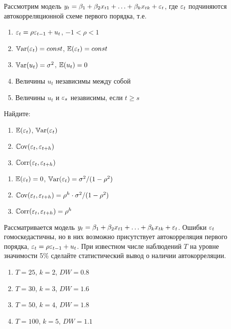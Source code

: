 \begin{problem}
Рассмотрим модель $y_t=\beta_1+\beta_2 x_{t1}+\ldots+\beta_k x_{tk}+\varepsilon_t$, где $\varepsilon_t$ подчиняются автокорреляционной схеме первого порядка, т.е.
\begin{enumerate}
\item $\varepsilon_t=\rho \varepsilon_{t-1}+u_t$, $-1<\rho<1$
\item $\mathbb{V}\mathrm{ar}(\varepsilon_t)=const$, $\mathbb{E}(\varepsilon_t)=const$
\item $\mathbb{V}\mathrm{ar}(u_t)=\sigma^2$, $\mathbb{E}(u_t)=0$
\item Величины $u_t$ независимы между собой
\item Величины $u_t$ и $\varepsilon_s$ независимы, если $t\geq s$
\end{enumerate}
Найдите:
\begin{enumerate}
\item $\mathbb{E}(\varepsilon_t)$, $\mathbb{V}\mathrm{ar}(\varepsilon_t)$
\item $\mathbb{C}\mathrm{ov}(\varepsilon_t,\varepsilon_{t+h})$
\item $\mathbb{C}\mathrm{orr}(\varepsilon_t,\varepsilon_{t+h})$
\end{enumerate}


\begin{sol}
\begin{enumerate}
\item $\mathbb{E}(\varepsilon_t)=0$, $\mathbb{V}\mathrm{ar}(\varepsilon_t)=\sigma^2/(1-\rho^2)$
\item $\mathbb{C}\mathrm{ov}(\varepsilon_t,\varepsilon_{t+h})=\rho^h\cdot \sigma^2/(1-\rho^2)$
\item $\mathbb{C}\mathrm{orr}(\varepsilon_t,\varepsilon_{t+h})=\rho^h$
\end{enumerate}
\end{sol}
\end{problem}



\begin{problem}
Рассматривается модель $y_t=\beta_1+\beta_2 x_{t1}+\ldots+\beta_k x_{tk}+\varepsilon_t$. Ошибки $\varepsilon_t$ гомоскедастичны, но в них возможно присутствует автокорреляция первого порядка, $\varepsilon_t=\rho \varepsilon_{t-1}+u_t$. При известном числе наблюдений $T$ на уровне значимости 5\% сделайте статистический вывод о наличии автокорреляции.
\begin{enumerate}
\item $T=25$, $k=2$, $DW=0.8$
\item $T=30$, $k=3$, $DW=1.6$
\item $T=50$, $k=4$, $DW=1.8$
\item $T=100$, $k=5$, $DW=1.1$
\end{enumerate}


\begin{sol}
\end{sol}
\end{problem}



